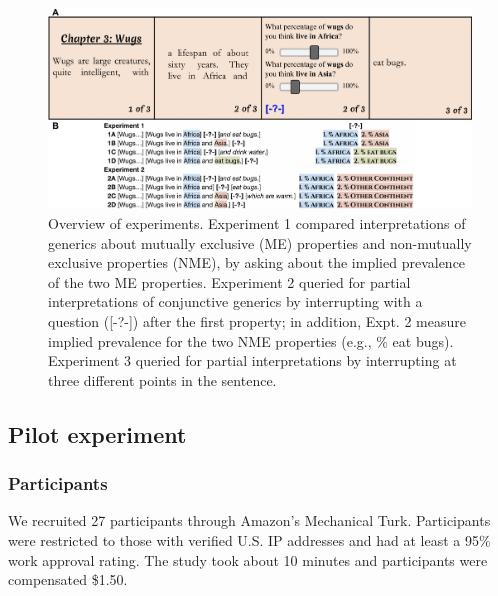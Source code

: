 \documentclass[10pt,letterpaper]{article}
\newcommand{\red}[1]{{\textcolor{Red}{#1}}}
\begin{document}


\begin{figure}[h]
  \centering
    \includegraphics[width=1\textwidth]{design}
  \caption{Overview of experiments. Experiment 1 compared interpretations of generics about mutually exclusive (ME) properties and non-mutually exclusive properties (NME), by asking about the implied prevalence of the two ME properties. Experiment 2 queried for partial interpretations of conjunctive generics by interrupting with a question ([-?-]) after the first property;  in addition, Expt. 2 measure implied prevalence for the two NME properties (e.g., \% eat bugs). Experiment 3 queried for partial interpretations by interrupting at three different points in the sentence. }
  \label{fig:design}
\end{figure}

\subsection{Pilot experiment}

\subsubsection{Participants}
We recruited 27 participants through Amazon's Mechanical Turk.
Participants were restricted to those with verified U.S. IP addresses and had at least a 95\% work approval rating. 
The study took about 10 minutes and participants were compensated \$1.50.
\end{document}
